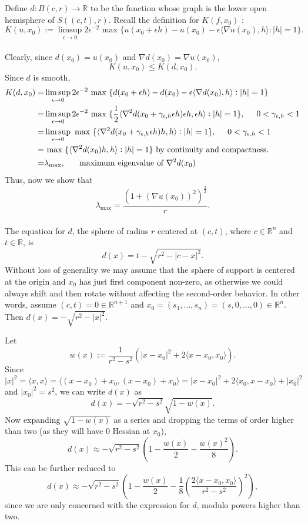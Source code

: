 \documentclass[10pt]{article}
\begin{document}
Define $d:B(c,r)\rightarrow \mathbb{R}$ to be the function whose graph is the lower open hemisphere of $S((c,t),r).$ 
Recall the definition for $K(f,x_0)$ :
$$K(u,x_0) := \limsup_{\epsilon \rightarrow 0} 2\epsilon^{-2} \text{ max } \{ u(x_0 + \epsilon h)  - u(x_0) - \epsilon \langle \nabla u(x_0), h \rangle : |h| =1 \}.$$\\
Clearly, since $d(x_0)=u(x_0)$ and $\nabla d(x_0)=\nabla u(x_0)$,
$$K(u,x_0)\leq K(d,x_0).$$
Since $d$ is smooth,
\begin{align*}
K(d,x_0) =& \limsup_{\epsilon \rightarrow 0} 2\epsilon^{-2} \text{ max } \{ d(x_0 + \epsilon h)  - d(x_0) - \epsilon \langle \nabla d(x_0), h \rangle : |h| =1 \} \\
=& \limsup_{\epsilon \rightarrow 0} 2\epsilon^{-2} \text{ max } \{ \frac{1}{2} \langle \nabla^2 d(x_0+ \gamma_{\epsilon,h} \epsilon h)\epsilon h, \epsilon h \rangle : |h| =1 \}, \hspace{5mm}0<\gamma_{\epsilon,h} <1 \\
=& \limsup_{\epsilon \rightarrow 0}  \text{ max } \{ \langle \nabla^2 d(x_0+ \gamma_{\epsilon,h} \epsilon h) h,  h \rangle : |h| =1 \}, \hspace{5mm}0<\gamma_{\epsilon,h} <1 \\
=& \text{ max } \{ \langle \nabla^2 d(x_0) h,  h \rangle : |h| =1\} \text{ by continuity and compactness.}\\
=& \lambda_\text{max}, \hspace{5mm} \text{ maximum eigenvalue of } \nabla^2 d(x_0)
\end{align*} 
Thus, now we show that $$\lambda_\text{max}=\dfrac{(1+(\nabla u(x_0))^2)^{\frac{3}{2}}}{r}.$$\\
The equation for $d$, the sphere of radius $r$ centered at $(c,t)$, where $c\in \mathbb{R}^n$ and $t\in \mathbb{R}$, is $$d(x)= t -\sqrt{r^2 -|c-x|^2}.$$ Without loss of generality we may assume that the sphere of support is centered at the origin and $x_0$ has just first component non-zero, as otherwise we could always shift and then rotate without affecting the second-order behavior. In other words, assume $(c,t)=0 \in \mathbb{R}^{n+1}$ and $x_0=(s_1,...,s_n)=(s,0,...,0)\in \mathbb{R}^n$. Then $d(x)= -\sqrt{r^2 -|x|^2}.$ 

Let $$w(x):= \frac{1}{r^2-s^2} \left( |x-x_0|^2 + 2\langle x-x_0,x_0 \rangle  \right).$$ Since $$|x|^2=\langle x,x \rangle= \langle (x-x_0)+x_0, (x-x_0)+x_0 \rangle= |x-x_0|^2 +2 \langle x_0, x-x_0 \rangle +|x_0|^2$$ and $|x_0|^2=s^2$, we can write $d(x)$ as 
$$d(x)=-\sqrt{r^2-s^2}\sqrt{1-w(x)}.$$
Now expanding $\sqrt{1-w(x)}$ as a series and dropping the terms of order higher than two (as they will have 0 Hessian at $x_0$), $$d(x)\approx -\sqrt{r^2-s^2} \left( 1-\frac{w(x)}{2} -\frac{w(x)^2}{8}  \right).$$ This can be further reduced to $$d(x)\approx -\sqrt{r^2-s^2} \left( 1-\frac{w(x)}{2} -\frac{1}{8}\left( \frac{2\langle x-x_0,x_0\rangle }{r^2-s^2}\right)^2  \right),$$ since we are only concerned with the expression for $d$, modulo powers higher than two.
\end{document}
